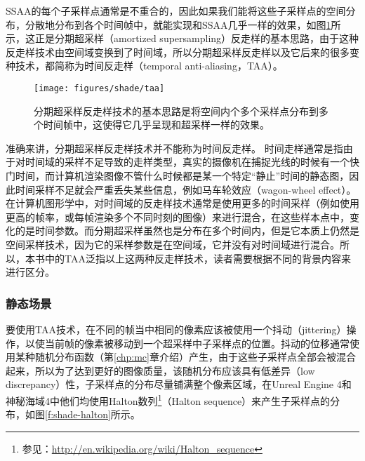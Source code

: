 SSAA的每个子采样点通常是不重合的，因此如果我们能将这些子采样点的空间分布，分散地分布到各个时间帧中，就能实现和SSAA几乎一样的效果，如图\ref{f:shade-spatial-to-temporal}所示，这正是分期超采样\cite{a:AmortizedSupersampling}（amortized supersampling）反走样的基本思路，由于这种反走样技术由空间域变换到了时间域，所以分期超采样反走样以及它后来的很多变种技术，都简称为时间反走样（temporal anti-aliasing，TAA）。

\begin{figure}
	\texttt{[image: figures/shade/taa]}
	\caption{分期超采样反走样技术的基本思路是将空间内个多个采样点分布到多个时间帧中，这使得它几乎呈现和超采样一样的效果。}
	\label{f:shade-spatial-to-temporal}
\end{figure}

\begin{shaded}
准确来讲，分期超采样反走样技术并不能称为时间反走样。	时间走样通常是指由于对时间域的采样不足导致的走样类型，真实的摄像机在捕捉光线的时候有一个快门时间，而计算机渲染图像不管什么时候都是某一个特定“静止”时间的静态图，因此时间采样不足就会严重丢失某些信息，例如马车轮效应（wagon-wheel effect）。在计算机图形学中，对时间域的反走样技术通常是使用更多的时间采样（例如使用更高的帧率，或每帧渲染多个不同时刻的图像）来进行混合，在这些样本点中，变化的是时间参数。而分期超采样虽然也是分布在多个时间内，但是它本质上仍然是空间采样技术，因为它的采样参数是在空间域，它并没有对时间域进行混合。所以，本书中的TAA泛指以上这两种反走样技术，读者需要根据不同的背景内容来进行区分。
\end{shaded}






\subsubsection{静态场景}
要使用TAA技术，在不同的帧当中相同的像素应该被使用一个抖动（jittering）操作，以使当前帧的像素被移动到一个超采样中子采样点的位置。抖动的位移通常使用某种随机分布函数（第\ref{chp:mc}章介绍）产生，由于这些子采样点全部会被混合起来，所以为了达到更好的图像质量，该随机分布应该具有低差异（low discrepancy）性，子采样点的分布尽量铺满整个像素区域，在Unreal Engine 4和神秘海域4中他们均使用Halton数列\footnote{参见：\url{http://en.wikipedia.org/wiki/Halton_sequence}}（Halton sequence）来产生子采样点的分布，如图\ref{f:shade-halton}所示。

